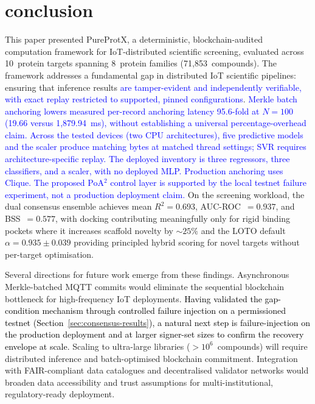 \documentclass[conference]{IEEEtran}
\newcommand{\rev}[2]{\textcolor{blue}{#2}}
\begin{document}
\section{\textbf{conclusion}}
\label{sec:conclusion}

This paper presented PureProtX, a deterministic,
blockchain-audited computation framework for IoT-distributed
scientific screening, evaluated across 10~protein targets
spanning 8~protein families (71{,}853~compounds).
The framework addresses a fundamental gap in distributed
IoT scientific pipelines: ensuring that inference results
\rev{R1.1}{are tamper-evident and independently verifiable, with exact replay restricted to supported, pinned configurations}.
\rev{R1.4, R2.2}{Merkle batch anchoring lowers measured
per-record anchoring latency 95.6-fold at $N{=}100$
(19.66 versus 1,879.94~ms), without establishing a universal
percentage-overhead claim.}
\rev{R1.1, R2.1}{Across the tested devices (two CPU architectures),
five predictive models and the scaler produce matching bytes
at matched thread settings; SVR requires architecture-specific
replay. The deployed inventory is three regressors, three
classifiers, and a scaler, with no deployed MLP.}
\rev{R1.2, R1.3, R2.4}{Production anchoring uses Clique.
The proposed PoA$^2$ control layer is supported by the local
testnet failure experiment, not a production deployment claim.} On the screening workload, the dual consensus ensemble
achieves mean $R^2{=}0.693$, AUC-ROC~$=0.937$, and
BSS~$=0.577$, with docking contributing meaningfully only
for rigid binding pockets where it increases scaffold
novelty by ${\sim}25\%$ and the LOTO default
$\alpha{=}0.935{\pm}0.039$ providing principled hybrid
scoring for novel targets without per-target optimisation.

Several directions for future work emerge from these
findings.
Asynchronous Merkle-batched MQTT commits would eliminate
the sequential blockchain bottleneck for high-frequency
IoT deployments.
\textcolor{black}{Having validated the gap-condition mechanism through
controlled failure injection on a permissioned testnet
(Section~\ref{sec:consensus-results}), a natural next step
is failure-injection on the production deployment and at
larger signer-set sizes to confirm the recovery envelope
at scale.}
Scaling to ultra-large libraries ($>10^6$~compounds) will
require distributed inference and batch-optimised
blockchain commitment.
Integration with FAIR-compliant data catalogues and
decentralised validator networks would broaden data
accessibility and trust assumptions for multi-institutional,
regulatory-ready deployment.
\end{document}
